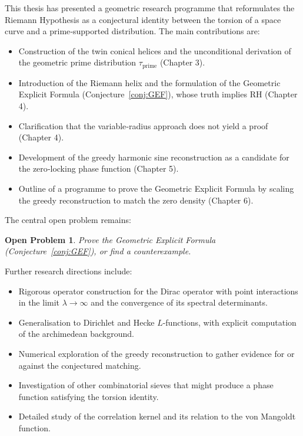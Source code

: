 \documentclass[12pt,a4paper,oneside]{book}
\newtheorem*{openproblem}{Open Problem}
\begin{document}
This thesis has presented a geometric research programme that reformulates the Riemann Hypothesis as a conjectural identity between the torsion of a space curve and a prime‑supported distribution.  The main contributions are:

\begin{itemize}
\item Construction of the twin conical helices and the unconditional derivation of the geometric prime distribution \(\tau_{\text{prime}}\) (Chapter 3).
\item Introduction of the Riemann helix and the formulation of the Geometric Explicit Formula (Conjecture~\ref{conj:GEF}), whose truth implies RH (Chapter 4).
\item Clarification that the variable‑radius approach does not yield a proof (Chapter 4).
\item Development of the greedy harmonic sine reconstruction as a candidate for the zero‑locking phase function (Chapter 5).
\item Outline of a programme to prove the Geometric Explicit Formula by scaling the greedy reconstruction to match the zero density (Chapter 6).
\end{itemize}

The central open problem remains:

\begin{openproblem}
Prove the Geometric Explicit Formula (Conjecture~\ref{conj:GEF}), or find a counterexample.
\end{openproblem}

Further research directions include:
\begin{itemize}
\item Rigorous operator construction for the Dirac operator with point interactions in the limit \(\lambda\to\infty\) and the convergence of its spectral determinants.
\item Generalisation to Dirichlet and Hecke \(L\)-functions, with explicit computation of the archimedean background.
\item Numerical exploration of the greedy reconstruction to gather evidence for or against the conjectured matching.
\item Investigation of other combinatorial sieves that might produce a phase function satisfying the torsion identity.
\item Detailed study of the correlation kernel and its relation to the von Mangoldt function.
\end{itemize}
\end{document}
